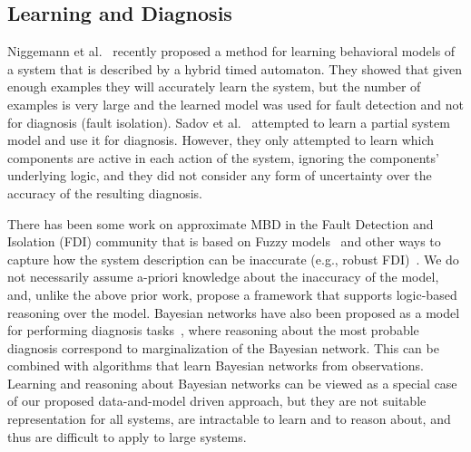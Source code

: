 \documentclass[12pt]{article}
\newcommand{\note}[1]{\textbf{\textit{#1}}}
\begin{document}
\subsection{Learning and Diagnosis}
Niggemann et al.~\cite{niggemann2012learning} recently proposed a method for learning behavioral models of a system that is described by a hybrid timed automaton. They showed that given enough examples they will accurately learn the system, but the number of examples is very large 
and the learned model was used for fault detection and not for diagnosis (fault isolation). Sadov et al.~\cite{sadov2010towards} attempted to learn a partial system model and use it for diagnosis. However, they only attempted to learn which components are active in each action of the system, ignoring the components' underlying logic, and they did not consider any form of uncertainty over the  accuracy of the resulting diagnosis. 

There has been some work on approximate MBD in the Fault Detection and Isolation (FDI) community that is based on Fuzzy models~\cite{dexter1997model,mendoncca2003fault,castillo2005model,mendoncca2009architecture} and other ways to capture how the system description can be inaccurate (e.g., robust FDI)~\cite{chen2012robust,frank1997survey}. 
We do not necessarily assume a-priori knowledge about the inaccuracy of the model, and, unlike the above prior work, propose a framework that supports logic-based reasoning over the model.
Bayesian networks have also been proposed as a model for performing diagnosis tasks~\cite{darwiche2009modeling,el1995diagnosing}, where reasoning about the most probable diagnosis correspond to marginalization of the Bayesian network. This can be combined with algorithms that learn Bayesian networks from observations. Learning and reasoning about Bayesian networks can be viewed as a special case of our proposed data-and-model driven approach, but they are not suitable representation for all systems, are intractable  to learn and to reason about, and thus are difficult to  apply to large systems. 

\end{document}
